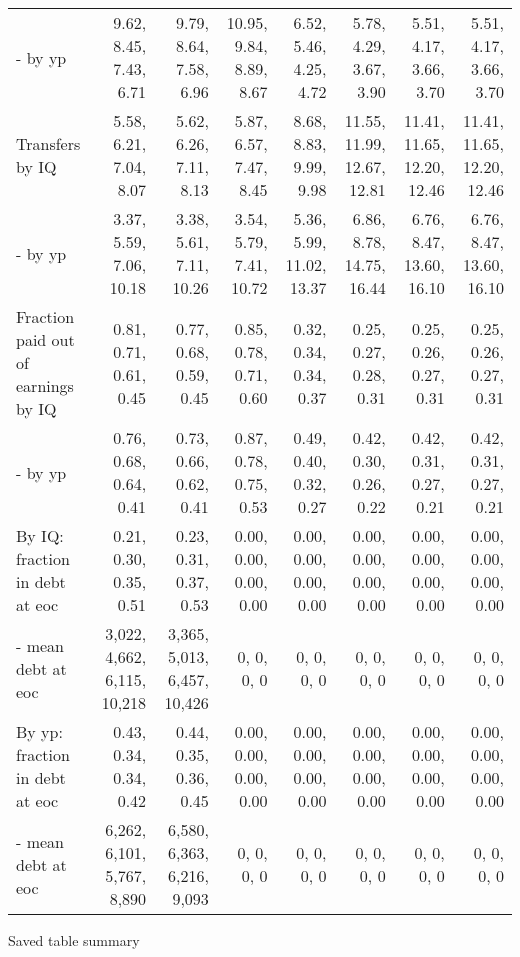 \begin{tabular}{lrrrrrrr}
- by yp & 9.62, 8.45, 7.43, 6.71  & 9.79, 8.64, 7.58, 6.96  & 10.95, 9.84, 8.89, 8.67  & 6.52, 5.46, 4.25, 4.72  & 5.78, 4.29, 3.67, 3.90  & 5.51, 4.17, 3.66, 3.70  & 5.51, 4.17, 3.66, 3.70  \\ 
Transfers by IQ & 5.58, 6.21, 7.04, 8.07  & 5.62, 6.26, 7.11, 8.13  & 5.87, 6.57, 7.47, 8.45  & 8.68, 8.83, 9.99, 9.98  & 11.55, 11.99, 12.67, 12.81  & 11.41, 11.65, 12.20, 12.46  & 11.41, 11.65, 12.20, 12.46  \\ 
- by yp & 3.37, 5.59, 7.06, 10.18  & 3.38, 5.61, 7.11, 10.26  & 3.54, 5.79, 7.41, 10.72  & 5.36, 5.99, 11.02, 13.37  & 6.86, 8.78, 14.75, 16.44  & 6.76, 8.47, 13.60, 16.10  & 6.76, 8.47, 13.60, 16.10  \\ 
Fraction paid out of earnings by IQ & 0.81, 0.71, 0.61, 0.45  & 0.77, 0.68, 0.59, 0.45  & 0.85, 0.78, 0.71, 0.60  & 0.32, 0.34, 0.34, 0.37  & 0.25, 0.27, 0.28, 0.31  & 0.25, 0.26, 0.27, 0.31  & 0.25, 0.26, 0.27, 0.31  \\ 
- by yp & 0.76, 0.68, 0.64, 0.41  & 0.73, 0.66, 0.62, 0.41  & 0.87, 0.78, 0.75, 0.53  & 0.49, 0.40, 0.32, 0.27  & 0.42, 0.30, 0.26, 0.22  & 0.42, 0.31, 0.27, 0.21  & 0.42, 0.31, 0.27, 0.21  \\ 
By IQ: fraction in debt at eoc & 0.21, 0.30, 0.35, 0.51  & 0.23, 0.31, 0.37, 0.53  & 0.00, 0.00, 0.00, 0.00  & 0.00, 0.00, 0.00, 0.00  & 0.00, 0.00, 0.00, 0.00  & 0.00, 0.00, 0.00, 0.00  & 0.00, 0.00, 0.00, 0.00  \\ 
- mean debt at eoc & 3,022, 4,662, 6,115, 10,218  & 3,365, 5,013, 6,457, 10,426  & 0, 0, 0, 0  & 0, 0, 0, 0  & 0, 0, 0, 0  & 0, 0, 0, 0  & 0, 0, 0, 0  \\ 
By yp: fraction in debt at eoc & 0.43, 0.34, 0.34, 0.42  & 0.44, 0.35, 0.36, 0.45  & 0.00, 0.00, 0.00, 0.00  & 0.00, 0.00, 0.00, 0.00  & 0.00, 0.00, 0.00, 0.00  & 0.00, 0.00, 0.00, 0.00  & 0.00, 0.00, 0.00, 0.00  \\ 
- mean debt at eoc & 6,262, 6,101, 5,767, 8,890  & 6,580, 6,363, 6,216, 9,093  & 0, 0, 0, 0  & 0, 0, 0, 0  & 0, 0, 0, 0  & 0, 0, 0, 0  & 0, 0, 0, 0  \\ 
\hline
\end{tabular}%
Saved table summary

